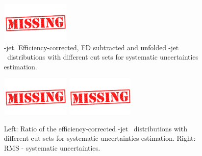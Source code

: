 \begin{figure}[bth]
\begin{center}
\includegraphics[width=0.3\textwidth]{missing}
\caption{\Dzero-jet. Efficiency-corrected, FD subtracted and unfolded \Dzero-jet \pt\ distributions with different cut sets for systematic uncertainties estimation.} 
\label{fig:JetPtSys_Dzero}
\end{center}
\end{figure}

\begin{figure}[bth]
\begin{center}
\includegraphics[width=0.3\textwidth]{missing}
\includegraphics[width=0.3\textwidth]{missing}
\caption{Left: Ratio of the efficiency-corrected \Dstar-jet \pt\ distributions with different cut sets for systematic uncertainties estimation. Right: RMS - systematic uncertainties.} 
\label{fig:JetPtSys_Dzero}
\end{center}
\end{figure}

%

